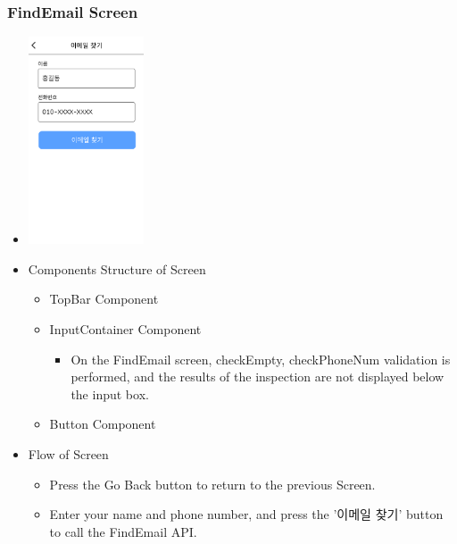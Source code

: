 \documentclass[conference]{IEEEtran}
\begin{document}
\subsubsection{FindEmail Screen}
\begin{itemize}
    \item[] \includegraphics[width=0.27\textwidth]{img/D/5.png}
    \item Components Structure of Screen
    \begin{itemize}
        \item TopBar Component
        \item InputContainer Component
        \begin{itemize}
            \item On the FindEmail screen, checkEmpty, checkPhoneNum validation is performed, and the results of the inspection are not displayed below the input box.
        \end{itemize}
        \item Button Component
    \end{itemize}
    \item Flow of Screen
    \begin{itemize}
        \item Press the Go Back button to return to the previous Screen.
        \item Enter your name and phone number, and press the '이메일 찾기' button to call the FindEmail API.
        \\
    \end{itemize}
\end{itemize}
\newpage
\end{document}
